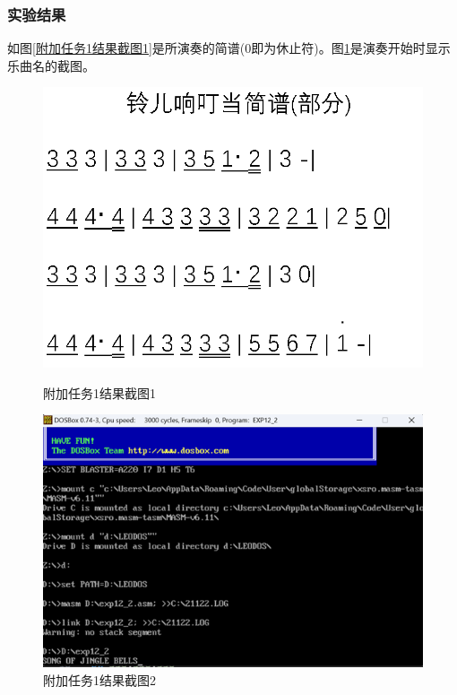 \documentclass[12pt, a4paper, oneside]{ctexart}
\begin{document}
\subsubsection{实验结果}
如图\ref{附加任务1结果截图1}是所演奏的简谱(0即为休止符)。图\ref{附加任务1结果截图2}是演奏开始时显示乐曲名的截图。
\begin{figure}[H]
    \centering
    \begin{minipage}{0.45\textwidth}
    \centering
    \includegraphics[scale=0.45]{pic/简谱.png}
    \caption{附加任务1结果截图1}
    \label{附加任务1结果截图1}
    \end{minipage}
    \hspace{0.05\textwidth}
    \begin{minipage}{0.45\textwidth}
    \centering
    \includegraphics[scale=0.50]{pic/exp12-2-1.png}
    \caption{附加任务1结果截图2}
    \label{附加任务1结果截图2}
    \end{minipage}
\end{figure}
\end{document}
